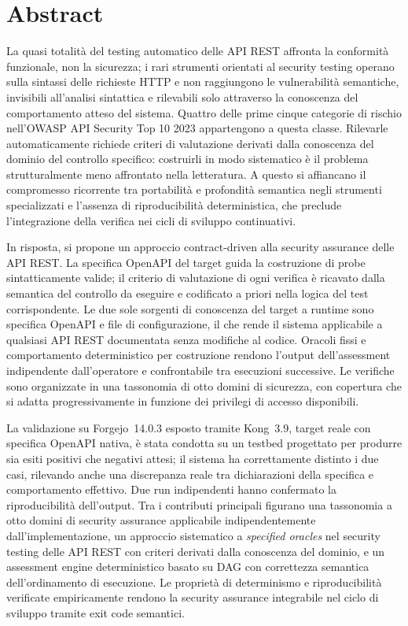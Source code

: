 \chapter*{Abstract}

La quasi totalità del testing automatico delle API REST affronta la conformità funzionale, non la sicurezza; i rari strumenti orientati al security testing operano sulla sintassi delle richieste HTTP e non raggiungono le vulnerabilità semantiche, invisibili all'analisi sintattica e rilevabili solo attraverso la conoscenza del comportamento atteso del sistema. Quattro delle prime cinque categorie di rischio nell'OWASP API Security Top 10 2023 appartengono a questa classe. Rilevarle automaticamente richiede criteri di valutazione derivati dalla conoscenza del dominio del controllo specifico: costruirli in modo sistematico è il problema strutturalmente meno affrontato nella letteratura. A questo si affiancano il compromesso ricorrente tra portabilità e profondità semantica negli strumenti specializzati e l'assenza di riproducibilità deterministica, che preclude l'integrazione della verifica nei cicli di sviluppo continuativi.

In risposta, si propone un approccio contract-driven alla security assurance delle API REST. La specifica OpenAPI del target guida la costruzione di probe sintatticamente valide; il criterio di valutazione di ogni verifica è ricavato dalla semantica del controllo da eseguire e codificato a priori nella logica del test corrispondente. Le due sole sorgenti di conoscenza del target a runtime sono specifica OpenAPI e file di configurazione, il che rende il sistema applicabile a qualsiasi API REST documentata senza modifiche al codice. Oracoli fissi e comportamento deterministico per costruzione rendono l'output dell'assessment indipendente dall'operatore e confrontabile tra esecuzioni successive. Le verifiche sono organizzate in una tassonomia di otto domini di sicurezza, con copertura che si adatta progressivamente in funzione dei privilegi di accesso disponibili.

La validazione su Forgejo~14.0.3 esposto tramite Kong~3.9, target reale con specifica OpenAPI nativa, è stata condotta su un testbed progettato per produrre sia esiti positivi che negativi attesi; il sistema ha correttamente distinto i due casi, rilevando anche una discrepanza reale tra dichiarazioni della specifica e comportamento effettivo. Due run indipendenti hanno confermato la riproducibilità dell'output. Tra i contributi principali figurano una tassonomia a otto domini di security assurance applicabile indipendentemente dall'implementazione, un approccio sistematico a \emph{specified oracles} nel security testing delle API REST con criteri derivati dalla conoscenza del dominio, e un assessment engine deterministico basato su DAG con correttezza semantica dell'ordinamento di esecuzione. Le proprietà di determinismo e riproducibilità verificate empiricamente rendono la security assurance integrabile nel ciclo di sviluppo tramite exit code semantici.